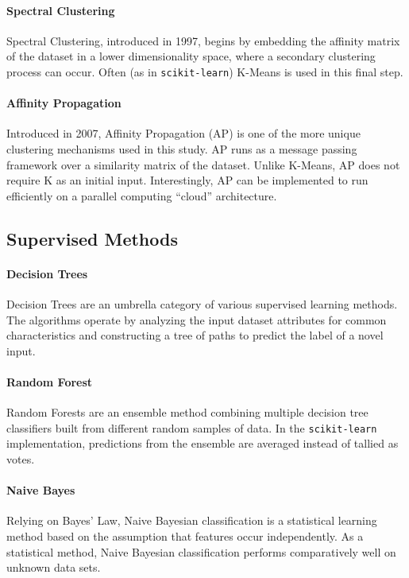 \documentclass[letterpaper,10pt]{article}
\begin{document}
\paragraph{Spectral Clustering} Spectral Clustering\cite{shi1997},
introduced in 1997, begins by embedding the affinity matrix of the dataset
in a lower dimensionality space, where a secondary clustering process can
occur. Often (as in \texttt{scikit-learn}) K-Means is used in this final
step.

\paragraph{Affinity Propagation} Introduced in 2007, Affinity
Propagation\cite{frey2007} (AP) is one of the more unique clustering
mechanisms used in this study. AP runs as a message passing framework over
a similarity matrix of the dataset. Unlike K-Means, AP does not require K
as an initial input.  Interestingly, AP can be implemented to run
efficiently on a parallel computing ``cloud'' architecture.\cite{rose2013}

\subsection{Supervised Methods}

\paragraph{Decision Trees} Decision Trees are an umbrella category of
various supervised learning methods. The algorithms operate by analyzing
the input dataset attributes for common characteristics and constructing a
tree of paths to predict the label of a novel input.

\paragraph{Random Forest} Random Forests\cite{breiman2001} are an ensemble
method combining multiple decision tree classifiers built from different
random samples of data. In the \texttt{scikit-learn} implementation,
predictions from the ensemble are averaged instead of tallied as votes.


\paragraph{Naive Bayes} Relying on Bayes' Law, Naive Bayesian
classification is a statistical learning method based on the assumption
that features occur independently. As a statistical method, Naive Bayesian
classification performs comparatively well on unknown data sets.
\end{document}

